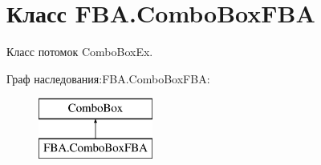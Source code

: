 \hypertarget{class_f_b_a_1_1_combo_box_f_b_a}{}\section{Класс F\+B\+A.\+Combo\+Box\+F\+BA}
\label{class_f_b_a_1_1_combo_box_f_b_a}


Класс потомок Combo\+Box\+Ex.  


Граф наследования\+:F\+B\+A.\+Combo\+Box\+F\+BA\+:\begin{figure}[H]
\begin{center}
\leavevmode
\includegraphics[height=2.000000cm]{class_f_b_a_1_1_combo_box_f_b_a}
\end{center}
\end{figure}
